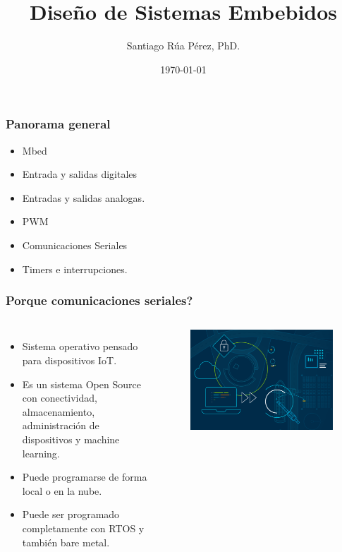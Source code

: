 \documentclass[10.5pt,scale=1.0,t,aspectratio=169,hyperref={pdfpagelabels=false}]{beamer}
\title{Diseño de Sistemas Embebidos}
\author{Santiago Rúa Pérez, PhD.}
\date{\today}
\begin{document}
	\begin{frame}
		\titlepage
	\end{frame}
	\frame{
		\begin{center}
			\LARGE \textcolor{blue}{MBED}
		\end{center}
		
	}
	

\begin{frame}
\frametitle{Panorama general}
\begin{itemize}
\item Mbed
\item Entrada y salidas digitales
\item Entradas y salidas analogas.
\item PWM
\item Comunicaciones Seriales
\item Timers e interrupciones.
\end{itemize}
\end{frame}
\begin{frame}
	\frametitle{Porque comunicaciones seriales?}
	\begin{columns}
		
		\begin{itemize}
			\item Sistema operativo pensado para dispositivos IoT.
			\item Es un sistema Open Source con conectividad, almacenamiento, administración de dispositivos y machine learning. 
			\item Puede programarse de forma local o en la nube.
			\item Puede ser programado completamente con RTOS y también bare metal. 
		\end{itemize}
		
		
		
		\begin{figure}
			\centering
			\includegraphics[scale=0.30]{01_Mbed}
		\end{figure}
	\end{columns}
\end{frame}
\end{document}
